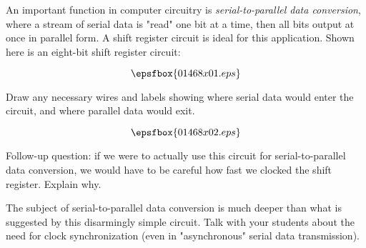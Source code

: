 

An important function in computer circuitry is {\it serial-to-parallel data conversion}, where a stream of serial data is "read" one bit at a time, then all bits output at once in parallel form.  A shift register circuit is ideal for this application.  Shown here is an eight-bit shift register circuit:

$$\epsfbox{01468x01.eps}$$

Draw any necessary wires and labels showing where serial data would enter the circuit, and where parallel data would exit.







$$\epsfbox{01468x02.eps}$$

\vskip 10pt

Follow-up question: if we were to actually use this circuit for serial-to-parallel data conversion, we would have to be careful how fast we clocked the shift register.  Explain why.







The subject of serial-to-parallel data conversion is much deeper than what is suggested by this disarmingly simple circuit.  Talk with your students about the need for clock synchronization (even in "asynchronous" serial data transmission).




